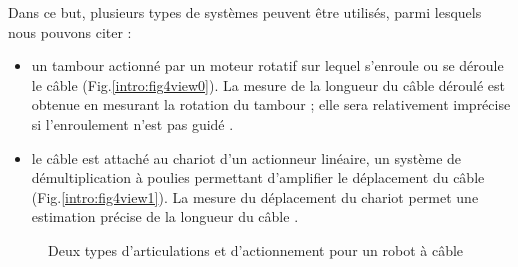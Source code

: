 Dans ce but, plusieurs types de systèmes peuvent être utilisés, parmi lesquels 
nous pouvons citer :
\begin{itemize}
 \item un tambour actionné par un moteur rotatif sur lequel s'enroule ou se 
déroule le câble (Fig.\ref{intro:fig4view0}). La mesure de la longueur du câble 
déroulé est obtenue en mesurant la rotation du tambour ; elle sera relativement 
imprécise si l'enroulement n'est pas guidé \cite{merlet2008}.
 \item le câble est attaché au chariot d'un actionneur linéaire, un système de 
démultiplication à poulies permettant d'amplifier le déplacement du câble 
(Fig.\ref{intro:fig4view1}). La mesure du déplacement du chariot permet une 
estimation précise de la longueur du câble \cite{merlet2008}. 
\end{itemize}

\begin{figure}[!ht]
  \centering
\hfill
    \caption{\footnotesize Deux types d'articulations et d'actionnement pour un 
robot à câble}
\label{intro:fig4}
\end{figure}

